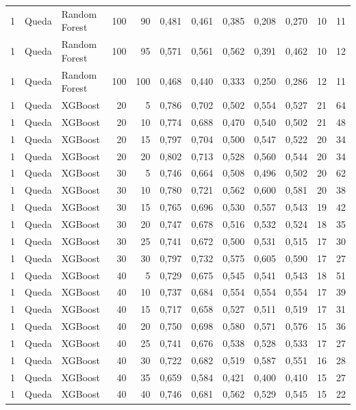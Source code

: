 \begin{longtable}{@{}rllrrrrrrrrr@{}}
1 & Queda & Random Forest & 100 & 90 & 0,481 & 0,461 & 0,385 & 0,208 & 0,270 & 10 & 11 \\
1 & Queda & Random Forest & 100 & 95 & 0,571 & 0,561 & 0,562 & 0,391 & 0,462 & 10 & 12 \\
1 & Queda & Random Forest & 100 & 100 & 0,468 & 0,440 & 0,333 & 0,250 & 0,286 & 12 & 11 \\
1 & Queda & XGBoost & 20 & 5 & 0,786 & 0,702 & 0,502 & 0,554 & 0,527 & 21 & 64 \\
1 & Queda & XGBoost & 20 & 10 & 0,774 & 0,688 & 0,470 & 0,540 & 0,502 & 21 & 48 \\
1 & Queda & XGBoost & 20 & 15 & 0,797 & 0,704 & 0,500 & 0,547 & 0,522 & 20 & 34 \\
1 & Queda & XGBoost & 20 & 20 & 0,802 & 0,713 & 0,528 & 0,560 & 0,544 & 20 & 34 \\
1 & Queda & XGBoost & 30 & 5 & 0,746 & 0,664 & 0,508 & 0,496 & 0,502 & 20 & 62 \\
1 & Queda & XGBoost & 30 & 10 & 0,780 & 0,721 & 0,562 & 0,600 & 0,581 & 20 & 38 \\
1 & Queda & XGBoost & 30 & 15 & 0,765 & 0,696 & 0,530 & 0,557 & 0,543 & 19 & 42 \\
1 & Queda & XGBoost & 30 & 20 & 0,747 & 0,678 & 0,516 & 0,532 & 0,524 & 18 & 35 \\
1 & Queda & XGBoost & 30 & 25 & 0,741 & 0,672 & 0,500 & 0,531 & 0,515 & 17 & 30 \\
1 & Queda & XGBoost & 30 & 30 & 0,797 & 0,732 & 0,575 & 0,605 & 0,590 & 17 & 27 \\
1 & Queda & XGBoost & 40 & 5 & 0,729 & 0,675 & 0,545 & 0,541 & 0,543 & 18 & 51 \\
1 & Queda & XGBoost & 40 & 10 & 0,737 & 0,684 & 0,554 & 0,554 & 0,554 & 17 & 39 \\
1 & Queda & XGBoost & 40 & 15 & 0,717 & 0,658 & 0,527 & 0,511 & 0,519 & 17 & 31 \\
1 & Queda & XGBoost & 40 & 20 & 0,750 & 0,698 & 0,580 & 0,571 & 0,576 & 15 & 36 \\
1 & Queda & XGBoost & 40 & 25 & 0,741 & 0,676 & 0,538 & 0,528 & 0,533 & 17 & 27 \\
1 & Queda & XGBoost & 40 & 30 & 0,722 & 0,682 & 0,519 & 0,587 & 0,551 & 16 & 28 \\
1 & Queda & XGBoost & 40 & 35 & 0,659 & 0,584 & 0,421 & 0,400 & 0,410 & 15 & 27 \\
1 & Queda & XGBoost & 40 & 40 & 0,746 & 0,681 & 0,562 & 0,529 & 0,545 & 15 & 22 \\

\end{longtable}
